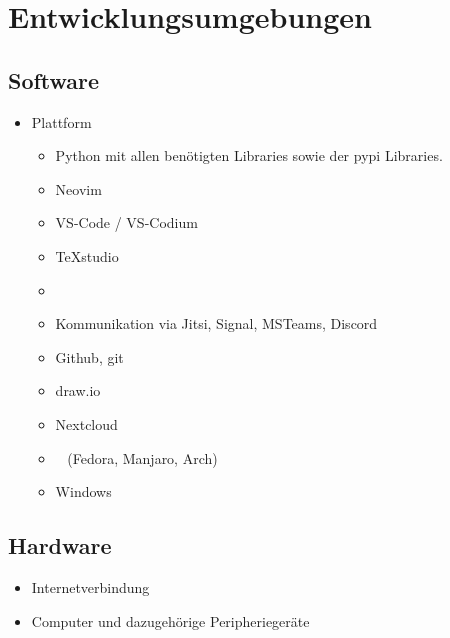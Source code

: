 \chapter{Entwicklungsumgebungen}

\section{Software}

\begin{itemize}
	\item Plattform
		\begin{itemize}
			\item Python mit allen benötigten Libraries sowie der pypi Libraries.
		\end{itemize}

		\begin{itemize}
			\item Neovim
			\item VS-Code / VS-Codium
			\item TeXstudio
			\item \Latex
			\item Kommunikation via Jitsi, Signal, MSTeams, Discord
			\item Github, git
			\item draw.io
			\item Nextcloud
			\item \Linux~ (Fedora, Manjaro, Arch)
			\item Windows
		\end{itemize}
\end{itemize}

\section{Hardware}

\begin{itemize}
	\item Internetverbindung
	\item Computer und dazugehörige Peripheriegeräte
\end{itemize}
